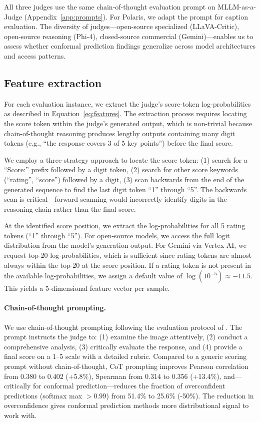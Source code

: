 \documentclass{article}
\begin{document}
All three judges use the same chain-of-thought evaluation prompt on MLLM-as-a-Judge (Appendix~\ref{app:prompts}). For Polaris, we adapt the prompt for caption evaluation. The diversity of judges---open-source specialized (LLaVA-Critic), open-source reasoning (Phi-4), closed-source commercial (Gemini)---enables us to assess whether conformal prediction findings generalize across model architectures and access patterns.

\subsection{Feature extraction}
\label{sec:features}

For each evaluation instance, we extract the judge's score-token log-probabilities as described in Equation~\ref{eq:features}. The extraction process requires locating the score token within the judge's generated output, which is non-trivial because chain-of-thought reasoning produces lengthy outputs containing many digit tokens (e.g., ``the response covers 3 of 5 key points'') before the final score.

We employ a three-strategy approach to locate the score token: (1) search for a ``Score:'' prefix followed by a digit token, (2) search for other score keywords (``rating'', ``score'') followed by a digit, (3) scan backwards from the end of the generated sequence to find the last digit token ``1'' through ``5''. The backwards scan is critical---forward scanning would incorrectly identify digits in the reasoning chain rather than the final score.

At the identified score position, we extract the log-probabilities for all 5 rating tokens (``1'' through ``5''). For open-source models, we access the full logit distribution from the model's generation output. For Gemini via Vertex AI, we request top-20 log-probabilities, which is sufficient since rating tokens are almost always within the top-20 at the score position. If a rating token is not present in the available log-probabilities, we assign a default value of $\log(10^{-5}) \approx -11.5$. This yields a 5-dimensional feature vector per sample.

\paragraph{Chain-of-thought prompting.} We use chain-of-thought prompting following the evaluation protocol of \citet{chen2024mllmasajudge}. The prompt instructs the judge to: (1) examine the image attentively, (2) conduct a comprehensive analysis, (3) critically evaluate the response, and (4) provide a final score on a 1--5 scale with a detailed rubric. Compared to a generic scoring prompt without chain-of-thought, CoT prompting improves Pearson correlation from 0.380 to 0.402 (+5.8\%), Spearman from 0.314 to 0.356 (+13.4\%), and---critically for conformal prediction---reduces the fraction of overconfident predictions (softmax max $> 0.99$) from 51.4\% to 25.6\% (-50\%). The reduction in overconfidence gives conformal prediction methods more distributional signal to work with.
\end{document}
